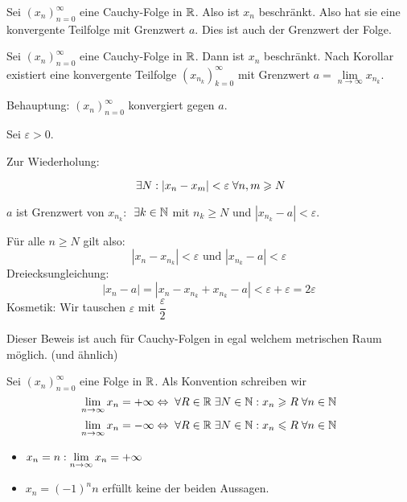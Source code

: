 \documentclass[main.tex]{subfiles}
\begin{document}
\begin{Beweis}
  Sei $(x_{n})_{n=0}^\infty$ eine Cauchy-Folge in $\mathbb{R}$. Also ist $x_n$ beschränkt. Also hat sie eine konvergente Teilfolge mit Grenzwert $a$. Dies ist auch der Grenzwert der Folge.

  Sei $(x_{n})_{n=0}^\infty$ eine Cauchy-Folge in $\mathbb{R}$. Dann ist $x_n$ beschränkt. Nach Korollar existiert eine konvergente Teilfolge $(x_{n_k})_{k=0}^\infty$ mit Grenzwert $a = \lim \limits_{n \to \infty} x_{n_k}$.

  Behauptung: $(x_{n})_{n=0}^\infty$ konvergiert gegen $a$.

  Sei $\varepsilon > 0$.

  Zur Wiederholung:
  \begin{Definition}
    $$\;\exists N : |x_n - x_m| < \varepsilon \;\forall n,m \geqslant N$$
  \end{Definition}

  $a$ ist Grenzwert von $x_{n_k}$: $\;\exists k \in \mathbb{N}$ mit $n_k \geq N$ und $|x_{n_k} - a| < \varepsilon$.

  Für alle $n \geq N$ gilt also:
  $$|x_n - x_{n_k}| < \varepsilon \text{ und } |x_{n_k} - a| < \varepsilon$$
  Dreiecksungleichung:
  $$|x_n - a| = |x_n - x_{n_k} + x_{n_k} - a| < \varepsilon + \varepsilon = 2\varepsilon$$
  Kosmetik: Wir tauschen $\varepsilon$ mit $\dfrac{\varepsilon}{2}$
\end{Beweis}
\begin{Bemerkung}
  Dieser Beweis ist auch für Cauchy-Folgen in egal welchem metrischen Raum möglich. (und ähnlich)
\end{Bemerkung}

\begin{Definition}
  Sei $(x_n)_{n=0}^\infty$ eine Folge in $\mathbb{R}$. Als Konvention schreiben wir
  $$\lim \limits_{n \to \infty} x_n = + \infty \Leftrightarrow \;\forall R \in \mathbb{R} \;\exists N \in \mathbb{N} : x_n \geqslant R \;\forall n \in \mathbb{N}$$
  $$\lim \limits_{n \to \infty} x_n = - \infty \Leftrightarrow \;\forall R \in \mathbb{R} \;\exists N \in \mathbb{N} : x_n \leqslant R \;\forall n \in \mathbb{N}$$
\end{Definition}
\begin{Beispiel}
  \begin{itemize}
    \item $x_n = n : \lim \limits_{n \to \infty} x_n = + \infty$
    \item $x_n = (-1)^n n$ erfüllt keine der beiden Aussagen.
  \end{itemize}
\end{Beispiel}
\end{document}
